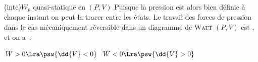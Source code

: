 \documentclass[../../main/main.tex]{subfiles}
\begin{document}
\begin{tcb*}[sidebyside, righthand ratio=.30](inte){$W_p$ quasi-statique en $(P,V)$}
	Puisque la pression est alors bien définie à chaque instant on peut la tracer
	entre les états. Le travail des forces de pression dans le cas mécaniquement
	réversible dans un diagramme de \textsc{Watt} $(P,V)$ est , et on a~:
	\begin{tasks}[label=\bdmd]
		\task $W > 0 \Lra \psw{\dd{V}<0}$
		\task $W < 0 \Lra \psw{\dd{V}>0}$
	\end{tasks}
	\tcblower
	\begin{center}
		\vspace{-30pt}
		\captionsetup{justification=centering}
	\end{center}
\end{tcb*}
\end{document}

